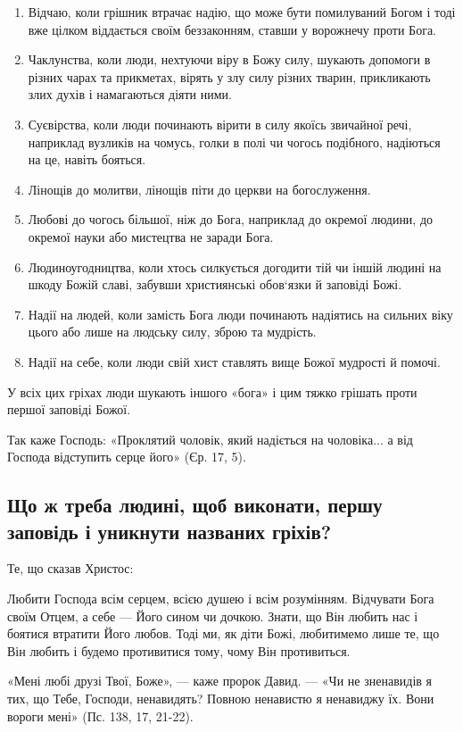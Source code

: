 \documentclass[main.tex]{subfiles}
\begin{document}
\begin{enumerate}
    \item Відчаю, коли грішник втрачає надію, що може бути помилуваний Богом і тоді вже цілком віддається своїм беззаконням, ставши у ворожнечу проти Бога.
    \item Чаклунства, коли люди, нехтуючи віру в Божу силу, шукають допомоги в різних чарах та прикметах, вірять у злу силу різних тварин, прикликають злих духів і намагаються діяти ними.
    \item Суєвірства, коли люди починають вірити в силу якоїсь звичайної речі, наприклад вузликів на чомусь, голки в полі чи чогось подібного, надіються на це, навіть бояться.
    \item Лінощів до молитви, лінощів піти до церкви на богослуження.
    \item Любові до чогось більшої, ніж до Бога, наприклад до окремої людини, до окремої науки або мистецтва не заради Бога.
    \item Людиноугодництва, коли хтось силкується догодити тій чи іншій людині на шкоду Божій славі, забувши християнські обов`язки й заповіді Божі.
    \item Надії на людей, коли замість Бога люди починають надіятись на сильних віку цього або лише на людську силу, зброю та мудрість.
    \item Надії на себе, коли люди свій хист ставлять вище Божої мудрості й помочі.
\end{enumerate}

У всіх цих гріхах люди шукають іншого «бога» і цим тяжко грішать проти першої заповіді Божої.

Так каже Господь: «Проклятий чоловік, який надіється на чоловіка... а від Господа відступить серце його» (Єр. 17, 5).
 
\subsection{Що ж треба людині, щоб виконати, першу заповідь і уникнути названих гріхів?}

Те, що сказав Христос:

Любити Господа всім серцем, всією душею і всім розумінням. Відчувати Бога своїм Отцем, а себе — Його сином чи дочкою. Знати, що Він любить нас і боятися втратити Його любов. Тоді ми, як діти Божі, любитимемо лише те, що Він любить і будемо противитися тому, чому Він противиться.

«Мені любі друзі Твої, Боже», — каже пророк Давид. — «Чи не зненавидів я тих, що Тебе, Господи, ненавидять? Повною ненавистю я ненавиджу їх. Вони вороги мені» (Пс. 138, 17, 21-22).
\end{document}
